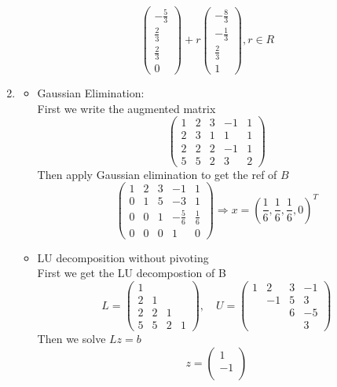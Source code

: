 \documentclass[english,onecolumn]{IEEEtran}
\begin{document}
\begin{enumerate}
$$\begin{pmatrix}
	-\frac{5}{3} \\ \frac{2}{3} \\ \frac{2}{3} \\ 0
	\end{pmatrix} + r
	\begin{pmatrix}
	-\frac{8}{3} \\ -\frac{1}{3} \\ \frac{2}{3} \\1
	\end{pmatrix}, r\in R$$
    \item 
    \begin{itemize}
    	\item Gaussian Elimination:\\
    	First we write the augmented matrix
    	$$\begin{pmatrix}
    	1 & 2 & 3 & -1 & 1 \\ 
    	2 & 3 & 1 & 1 & 1 \\ 
    	2 & 2 & 2 & -1 & 1 \\ 
    	5 & 5 & 2 & 3 & 2
    	\end{pmatrix} $$
    	Then apply Gaussian elimination to get the ref of $B$
  		$$\begin{pmatrix}
  		1 & 2 & 3 & -1 & 1 \\ 
  		0 & 1 & 5 & -3 & 1 \\ 
  		0 & 0 & 1 & -\frac{5}{6} & \frac{1}{6} \\ 
  		0 & 0 & 0 & 1 & 0
  		\end{pmatrix} \Rightarrow x = (\frac{1}{6},\frac{1}{6},\frac{1}{6},0)^T$$
  		\item LU decomposition without pivoting\\
 		First we get the LU decompostion of B
 		$$L=\begin{pmatrix}
 		1 &  &  &  \\ 
 		2 & 1 &  &  \\ 
 		2 & 2 & 1 &  \\ 
 		5 & 5 & 2 & 1
 		\end{pmatrix},\quad U= \begin{pmatrix}
 		1 & 2 & 3 & -1 \\ 
 		& -1 & 5 & 3 \\ 
 		&  & 6 & -5 \\ 
 		&  &  & 3
 		\end{pmatrix} $$
 		Then we solve $Lz = b$
 		$$z = \begin{pmatrix}
 		1 \\ 
 		-1 \\ 

\end{pmatrix}$$
\end{itemize}
\end{enumerate}
\end{document}
